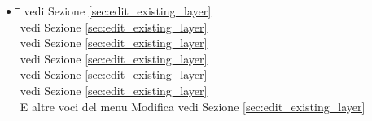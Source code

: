 \begin{itemize}
\item {}
\begin{tabbing}
\hspace{4.5cm}\=\hspace{3cm}\=\hspace{3.5cm}\= \kill
{} 
	\> 
	\> vedi Sezione \ref{sec:edit_existing_layer} 
	\>  \\
	\> 
	\> vedi Sezione \ref{sec:edit_existing_layer} 
	\>  \\
	\> 
	\> vedi Sezione \ref{sec:edit_existing_layer} 
	\>  \\
	\> 
	\> vedi Sezione \ref{sec:edit_existing_layer} 
	\>  \\
	\> \keystroke{/}
	\> vedi Sezione \ref{sec:edit_existing_layer} 
	\>  \\
	\> 
	\> vedi Sezione \ref{sec:edit_existing_layer} 
	\>  \\
E altre voci del menu Modifica
	\>
	\> vedi Sezione \ref{sec:edit_existing_layer} 
	\>  \\
\end{tabbing}



\end{itemize}
